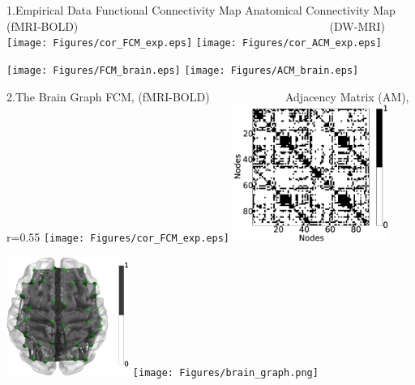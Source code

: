 \documentclass{beamer}
\begin{document}
\begin{frame}{1.Empirical Data}
\centering
\footnotesize{Functional Connectivity Map  \;\;\;\;\;\;\;   Anatomical Connectivity Map} \\
\tiny{ (fMRI-BOLD) 	~~~~~~~~~~~~~~~~~~~~~~~~~~~~~~~~~~~~~~~~~~~	(DW-MRI) }				  
	\texttt{[image: Figures/cor\_FCM\_exp.eps]}
	\texttt{[image: Figures/cor\_ACM\_exp.eps]}
 
	\texttt{[image: Figures/FCM\_brain.eps]}
	\texttt{[image: Figures/ACM\_brain.eps]}

\end{frame}


\begin{frame}{2.The Brain Graph}
\centering
\footnotesize{FCM, (fMRI-BOLD) ~~~~~~~~~~~~  Adjacency Matrix (AM), r=0.55} 
	\texttt{[image: Figures/cor\_FCM\_exp.eps]} 
	\includegraphics[width=0.38\textwidth]{Figures/Sample_Adj.eps} 
	
	\includegraphics[width=0.30\textwidth]{Figures/Sample_Adj_brain.eps}  
    \texttt{[image: Figures/brain\_graph.png]}      

\end{frame}
\end{document}
